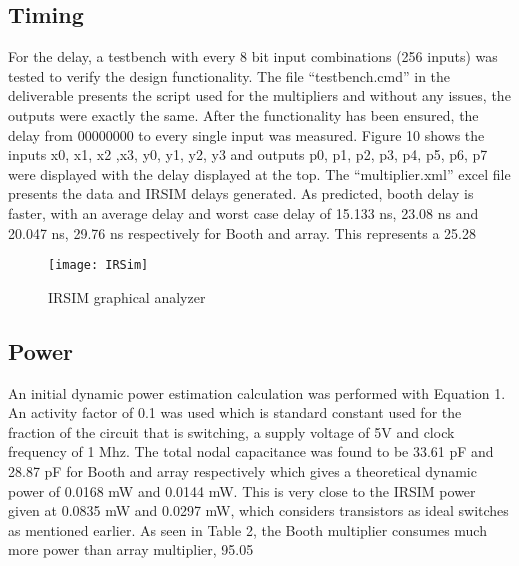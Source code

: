 \documentclass[conference]{IEEEtran}
\begin{document}
\subsection{Timing}
For the delay, a testbench with every 8 bit input combinations (256 inputs) was tested to verify the design functionality. The file “testbench.cmd” in the deliverable presents the script used for the multipliers and without any issues, the outputs were exactly the same. After the functionality has been ensured, the delay from 00000000 to every single input was measured. Figure 10 shows the inputs x0, x1, x2 ,x3, y0, y1, y2, y3 and outputs p0, p1, p2, p3, p4, p5, p6, p7 were displayed with the delay displayed at the top. The “multiplier.xml” excel file presents the data and IRSIM delays generated.  As predicted, booth delay is faster, with an average delay and worst case delay of 15.133 ns, 23.08 ns and 20.047 ns, 29.76 ns respectively for Booth and array. This represents a 25.28%

\begin{figure}[!htb]
\centering
\texttt{[image: IRSim]}
\caption{IRSIM graphical analyzer}
\label{fig_sim}
\end{figure}

\subsection{Power}
An initial dynamic power estimation calculation was performed with Equation 1. An activity factor of 0.1 was used which is standard constant used for the fraction of the circuit that is switching, a supply voltage of 5V and clock frequency of 1 Mhz. The total nodal capacitance was found to be 33.61 pF and 28.87 pF for Booth and array respectively which gives a theoretical dynamic power of 0.0168 mW and 0.0144 mW. This is very close to the IRSIM power given at 0.0835 mW and 0.0297 mW, which considers transistors as ideal switches as mentioned earlier. As seen in Table 2, the Booth multiplier consumes much more power than array multiplier, 95.05%
\end{document}
